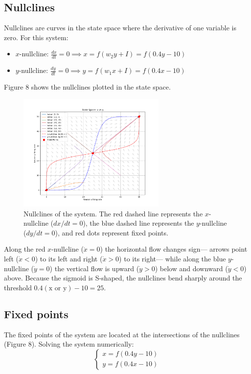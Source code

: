 \documentclass{article}
\begin{document}
\subsection{Nullclines}

Nullclines are curves in the state space where the derivative of one variable is zero. For this system:
\begin{itemize}
    \item $x$-nullcline: $\frac{dx}{dt} = 0 \implies x = f(w_2 y + I) = f(0.4y - 10)$
    \item $y$-nullcline: $\frac{dy}{dt} = 0 \implies y = f(w_1 x + I) = f(0.4x - 10)$
\end{itemize}

Figure 8 shows the nullclines plotted in the state space.

\begin{figure}[H]
    \centering
    \includegraphics[width=0.65\textwidth]{state_space2_fixed_points.png}
    \caption{Nullclines of the system. The red dashed line represents the $x$-nullcline ($dx/dt = 0$), the blue dashed line represents the $y$-nullcline ($dy/dt = 0$), and red dots represent fixed points. }
    \label{fig:nullclines}
\end{figure}

Along the red \(x\)-nullcline (\(\dot{x}=0\)) the horizontal flow changes sign—
arrows point left (\(\dot{x}<0\)) to its left and right (\(\dot{x}>0\)) to its right—
while along the blue \(y\)-nullcline (\(\dot{y}=0\)) the vertical flow is upward
(\(\dot{y}>0\)) below and downward (\(\dot{y}<0\)) above.
Because the sigmoid is S-shaped, the nullclines bend sharply around the threshold
\(0.4(\text{x or y})-10=25\).
\subsection{Fixed points}
The fixed points of the system are located at the intersections of the nullclines (Figure 8). Solving the system numerically:
\begin{equation}
\begin{cases}
x = f(0.4y - 10)\\
y = f(0.4x - 10)
\end{cases}
\end{equation}
\end{document}
